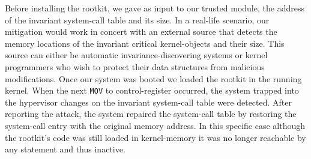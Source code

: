 %
%
%

Before installing the rootkit, we gave as input to our trusted module, the address of the invariant system-call table
and its size. In a real-life scenario, our mitigation would work in concert with an external source that detects the memory locations of the invariant critical kernel-objects and their size. This source can either be automatic invariance-discovering systems or kernel programmers who wish to protect their data structures from malicious modifications. 
Once our system was booted we loaded the rootkit in the running kernel. When the next \texttt{MOV} to control-register occurred, the system trapped into the hypervisor changes on the invariant system-call table were detected. After reporting the attack, the system repaired the system-call table by restoring the system-call entry with the original memory address. In this specific case although the rootkit's code was still loaded in kernel-memory it was no longer reachable by any statement and thus inactive. 


